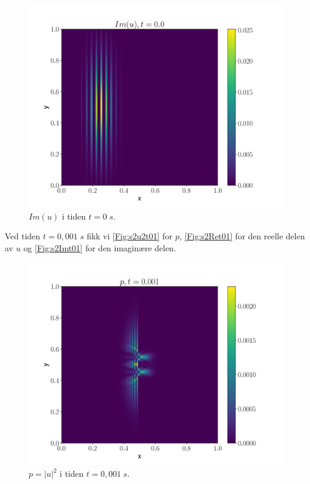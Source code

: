 \documentclass[reprint,english,notitlepage]{revtex4-2}  %
\begin{document}
\begin{figure}[H]
	\centering
	\includegraphics[scale=0.45, trim={0cm 0 0 0}]{../Images/ImshowIm00sl2.pdf}
	\caption{$Im(u) $ i tiden $t = 0 \; s$.}
	\label{Fig:s2u2t0Im}
\end{figure}


Ved tiden $t = 0,001 \; s$ fikk vi \autoref{Fig:s2u2t01} for $p$, \autoref{Fig:s2Ret01} for den reelle delen av $u$ og \autoref{Fig:s2Imt01} for den imaginære delen.

\begin{figure}[H]
	\centering
	\includegraphics[scale=0.45, trim={1cm 0 0 0}]{../Images/ImshowUt0001sl2.pdf}
	\caption{$p=|u|^2$ i tiden $t = 0,001 \; s$.}
	\label{Fig:s2u2t01}
\end{figure}
\end{document}
